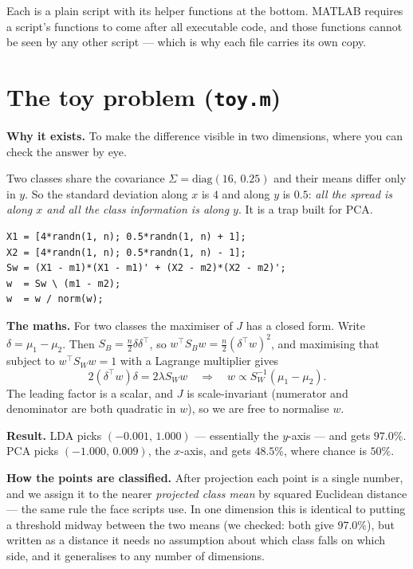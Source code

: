 \documentclass[11pt]{article}
\newcommand{\T}{^{\top}}
\begin{document}
Each is a plain script with its helper functions at the bottom. MATLAB requires
a script's functions to come after all executable code, and those functions
cannot be seen by any other script --- which is why each file carries its own
copy.

\section{The toy problem (\texttt{toy.m})}

\textbf{Why it exists.} To make the difference visible in two dimensions, where
you can check the answer by eye.

Two classes share the covariance $\Sigma=\mathrm{diag}(16,\,0.25)$ and their
means differ only in $y$. So the standard deviation along $x$ is $4$ and along
$y$ is $0.5$: \emph{all the spread is along $x$ and all the class information
is along $y$}. It is a trap built for PCA.

\begin{lstlisting}
X1 = [4*randn(1, n); 0.5*randn(1, n) + 1];
X2 = [4*randn(1, n); 0.5*randn(1, n) - 1];
Sw = (X1 - m1)*(X1 - m1)' + (X2 - m2)*(X2 - m2)';
w  = Sw \ (m1 - m2);
w  = w / norm(w);
\end{lstlisting}

\textbf{The maths.} For two classes the maximiser of $J$ has a closed form.
Write $\delta=\mu_1-\mu_2$. Then $S_B=\tfrac n2\delta\delta\T$, so
$w\T S_Bw=\tfrac n2(\delta\T w)^2$, and maximising that subject to
$w\T S_Ww=1$ with a Lagrange multiplier gives
\[ 2(\delta\T w)\delta=2\lambda S_Ww\quad\Longrightarrow\quad w\propto S_W^{-1}(\mu_1-\mu_2). \]
The leading factor is a scalar, and $J$ is scale-invariant (numerator and
denominator are both quadratic in $w$), so we are free to normalise $w$.

\textbf{Result.} LDA picks $(-0.001,\,1.000)$ --- essentially the $y$-axis ---
and gets $97.0\%$. PCA picks $(-1.000,\,0.009)$, the $x$-axis, and gets
$48.5\%$, where chance is $50\%$.

\textbf{How the points are classified.} After projection each point is a single
number, and we assign it to the nearer \emph{projected class mean} by squared
Euclidean distance --- the same rule the face scripts use. In one dimension
this is identical to putting a threshold midway between the two means (we
checked: both give $97.0\%$), but written as a distance it needs no assumption
about which class falls on which side, and it generalises to any number of
dimensions.
\end{document}
